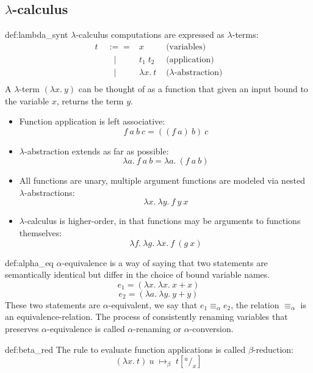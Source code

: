 \documentclass[landscape, 8pt]{extarticle}
\begin{document}
\begin{multicols}{3}
\subsection*{$\lambda$-calculus}
\begin{dfn}[Syntax]{def:lambda_synt}{}
$\lambda$-calculus computations are expressed as $\lambda$-terms:
\begin{equation}
\begin{aligned}
    t \; & :== & x & \text{    (variables)} \nonumber \\
       &\;\;\:|& t_1 \; t_2 & \text{    (application)} \nonumber \\
       &\;\;\:|& \lambda x.\:t & \text{    ($\lambda$-abstraction)} \nonumber \\
\end{aligned}
\end{equation}
A $\lambda$-term $(\lambda x.\:y)$ can be thought of as a function that given an input bound to the variable $x$, returns the term $y$.
\begin{itemize}
    \item Function application is left associative:
\[f\:a\:b\:c = ((f\:a)\:b)\:c\]
    \item $\lambda$-abstraction extends as far as possible:
\[\lambda a.\:f\:a\:b = \lambda a.\:(f\:a\:b)\]
\item All functions are unary, multiple argument functions are modeled via nested $\lambda$-abstractions:
\[\lambda x.\:\lambda y.\:f\:y\:x\]
\item $\lambda$-calculus is higher-order, in that functions may be arguments to functions themselves:
\[\lambda f.\:\lambda g.\:\lambda x.\:f\:(g\:x)\]
\end{itemize}
\end{dfn}

\begin{dfn}{def:alpha_eq}{}
$\alpha$-equivalence is a way of saying that two statements are semantically identical but differ in the choice of bound variable names.
\[e_1 = (\lambda x.\:\lambda x.\:x + x)\]
\[e_2 = (\lambda a.\:\lambda y.\:y + y)\]
These two statements are $\alpha$-equivalent, we say that $e_1 \equiv_\alpha e_2$, the relation $\equiv_\alpha$ is an equivalence-relation. The process of consistently renaming variables that preserves $\alpha$-equivalence is called $\alpha$-renaming or $\alpha$-conversion.    
\end{dfn}

\begin{dfn}{def:beta_red}{}
The rule to evaluate function applications is called $\beta$-reduction:
\[(\lambda x.\:t)\:u \; \mapsto_\beta \; t[^u/_x]\]


\end{dfn}
\end{multicols}
\end{document}
